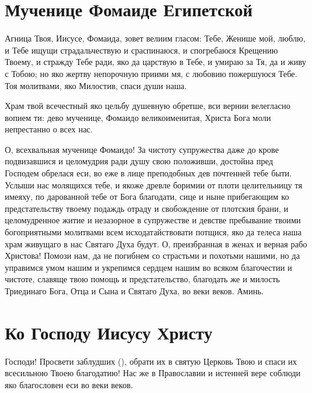  

\section{Мученице Фомаиде Египетской}\begin{mymulticols}
 


 Агница Твоя, Иисусе, Фомаида, зовет велиим гласом: Тебе, Женише мой, люблю, и Тебе ищущи страдальчествую и сраспинаюся, и спогребаюся Крещению Твоему, и стражду Тебе ради, яко да царствую в Тебе, и умираю за Тя, да и живу с Тобою; но яко жертву непорочную приими мя, с любовию пожершуюся Тебе. Тоя молитвами, яко Милостив, спаси души наша.


 Храм твой всечестный яко цельбу душевную обретше, вси вернии велегласно вопием ти: дево мученице, Фомаидо великоименитая, Христа Бога моли непрестанно о всех нас.


 О, всехвальная мученице Фомаидо! За чистоту супружества даже до крове подвизавшися и целомудрия ради душу свою положивши, достойна пред Господем обрелася еси, во еже в лице преподобных дев почтенней тебе быти. Услыши нас молящихся тебе, и якоже древле боримии от плоти целительницу тя имеяху, по дарованной тебе от Бога благодати, сице и ныне прибегающим ко предстательству твоему подаждь отраду и свобождение от плотския брани, и целомудренное житие и незазорное в супружестве и девстве пребывание твоими богоприятными молитвами всем исходатайствовати потщися, яко да телеса наша храм живущаго в нас Святаго Духа будут. О, преизбранная в женах и верная рабо Христова! Помози нам, да не погибнем со страстьми и похотьми нашими, но да управимся умом нашим и укрепимся сердцем нашим во всяком благочестии и чистоте, славяще твою помощь и предстательство, благодать же и милость Триединаго Бога, Отца и Сына и Святаго Духа, во веки веков. Аминь. 

\end{mymulticols}

\mychapterending


 

\section{Ко Господу Иисусу Христу}\begin{mymulticols}
 

Господи! Просвети заблудших (), обрати их в святую Церковь Твою и спаси их всесильною Твоею благодатию! Нас же в Православии и истенней вере соблюди яко благословен еси во веки веков.

\end{mymulticols}

